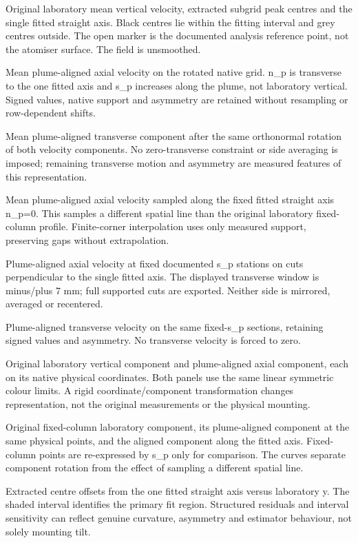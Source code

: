 \caption{Original laboratory mean vertical velocity, extracted subgrid peak centres and the single fitted straight axis. Black centres lie within the fitting interval and grey centres outside. The open marker is the documented analysis reference point, not the atomiser surface. The field is unsmoothed.}

\caption{Mean plume-aligned axial velocity on the rotated native grid. n_p is transverse to the one fitted axis and s_p increases along the plume, not laboratory vertical. Signed values, native support and asymmetry are retained without resampling or row-dependent shifts.}

\caption{Mean plume-aligned transverse component after the same orthonormal rotation of both velocity components. No zero-transverse constraint or side averaging is imposed; remaining transverse motion and asymmetry are measured features of this representation.}

\caption{Mean plume-aligned axial velocity sampled along the fixed fitted straight axis n_p=0. This samples a different spatial line than the original laboratory fixed-column profile. Finite-corner interpolation uses only measured support, preserving gaps without extrapolation.}

\caption{Plume-aligned axial velocity at fixed documented s_p stations on cuts perpendicular to the single fitted axis. The displayed transverse window is minus/plus 7 mm; full supported cuts are exported. Neither side is mirrored, averaged or recentered.}

\caption{Plume-aligned transverse velocity on the same fixed-s_p sections, retaining signed values and asymmetry. No transverse velocity is forced to zero.}

\caption{Original laboratory vertical component and plume-aligned axial component, each on its native physical coordinates. Both panels use the same linear symmetric colour limits. A rigid coordinate/component transformation changes representation, not the original measurements or the physical mounting.}

\caption{Original fixed-column laboratory component, its plume-aligned component at the same physical points, and the aligned component along the fitted axis. Fixed-column points are re-expressed by s_p only for comparison. The curves separate component rotation from the effect of sampling a different spatial line.}

\caption{Extracted centre offsets from the one fitted straight axis versus laboratory y. The shaded interval identifies the primary fit region. Structured residuals and interval sensitivity can reflect genuine curvature, asymmetry and estimator behaviour, not solely mounting tilt.}

